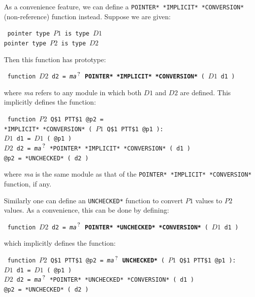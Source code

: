 \documentclass[12pt]{article}
\newcommand{\QMARK}{{$^{\,\mbox{\footnotesize ?}}$}}
\newcommand{\ttkey}[1]{{\tt \bfseries #1}}
\newenvironment{indpar}[1][0.3in]%
	{\begin{list}{}%
		     {\setlength{\itemsep}{0in}%
		      \setlength{\topsep}{0in}%
		      \setlength{\parsep}{1ex}%
		      \setlength{\labelwidth}{#1}%
		      \setlength{\leftmargin}{#1}%
		      \addtolength{\leftmargin}{\labelsep}}%
	 \item}%
	{\end{list}}
\begin{document}
As a convenience feature, we can define a
{\tt *POINTER* *IMPLICIT* *CONVERSION*} (non-reference) function instead.
 Suppose we are given:
\begin{indpar} \tt
pointer type $P1$ is type $D1$ \\
pointer type $P2$ is type $D2$
\end{indpar}
Then this function has prototype:
\begin{indpar}\label{POINTER-IMPLICIT-CONVERSION} \tt
function $D2$ d2 = {\em ma}\QMARK{} \ttkey{*POINTER* *IMPLICIT* *CONVERSION*}
                  ( $D1$ d1 )
\end{indpar}
where {\em ma} refers to any module in which both $D1$ and $D2$ are defined.
This implicitly defines the function:
\begin{indpar} \tt
function $P2$ Q\$1 PTT\$1 @p2 = \\
\hspace*{1in}{\em ma}\QMARK{} *IMPLICIT* *CONVERSION*
			( $P1$ Q\$1 PTT\$1 @p1 ): \\
\hspace*{0.3in}$D1$ d1 = $D1$ ( @p1 ) \\
\hspace*{0.3in}$D2$ d2 =
    {\em ma}\QMARK{} *POINTER* *IMPLICIT* *CONVERSION* ( d1 ) \\
\hspace*{0.3in}@p2 = *UNCHECKED* ( d2 )
\end{indpar}
where {\em ma} is the same module as that of the
{\tt *POINTER* *IMPLICIT* *CONVERSION*} function, if any.

Similarly one can define an {\tt *UNCHECKED*} function to convert
$P1$ values to $P2$ values.  As a convenience, this can be
done by defining:
\begin{indpar} \tt
function $D2$ d2 = {\em ma}\QMARK{}  \ttkey{*POINTER* *UNCHECKED* *CONVERSION*}
			( $D1$ d1 )
\end{indpar}
which implicitly defines the function:
\begin{indpar} \tt
function $P2$ Q\$1 PTT\$1 @p2 = {\em ma}\QMARK{} \ttkey{*UNCHECKED*}
	( $P1$ Q\$1 PTT\$1 @p1 ): \\
\hspace*{0.3in}$D1$ d1 = $D1$ ( @p1 ) \\
\hspace*{0.3in}$D2$ d2 =
    {\em ma}\QMARK{} *POINTER* *UNCHECKED* *CONVERSION* ( d1 ) \\
\hspace*{0.3in}@p2 = *UNCHECKED* ( d2 )
\end{indpar}
\end{document}
